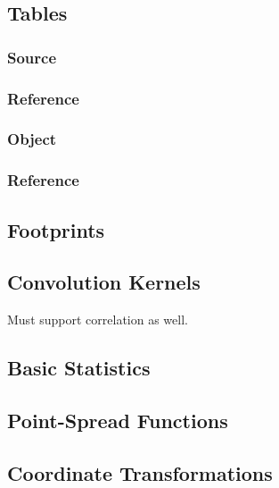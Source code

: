 \subsection{Tables}
\label{sec:spTables}

\subsubsection{Source}
\label{sec:spTablesSource}

\subsubsection{Reference}
\label{sec:spTablesReference}

\subsubsection{Object}
\label{sec:spTablesObject}

\subsubsection{Reference}
\label{sec:spTablesReference}

\subsection{Footprints}
\label{sec:spFootprints}

\subsection{Convolution Kernels}
\label{sec:spKernels}
Must support correlation as well.

\subsection{Basic Statistics}
\label{sec:spStatistics}

\subsection{Point-Spread Functions}
\label{sec:spPSF}

\subsection{Coordinate Transformations}
\label{sec:spWCS}

